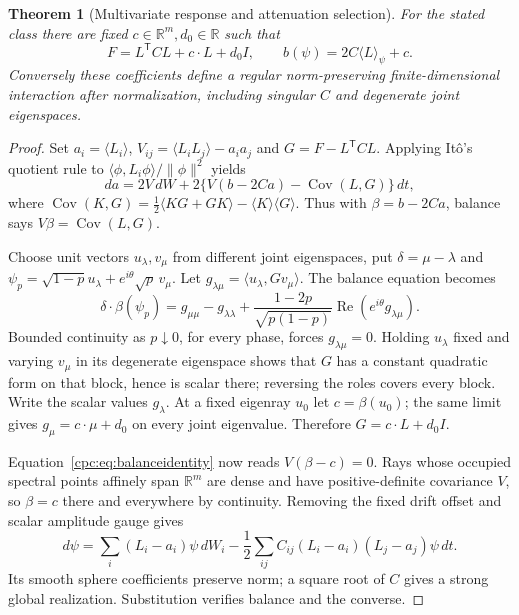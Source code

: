 \documentclass[11pt,oneside,openany]{book}
\newtheorem{theorem}{Theorem}[chapter]
\theoremstyle{definition}
\theoremstyle{remark}\newtheorem{remark}[theorem]{Remark}
\begin{document}
\begin{theorem}[Multivariate response and attenuation selection]
\label{cpc:thm:multivariate}
For the stated class there are fixed $c\in\mathbb R^m,d_0\in\mathbb R$ such that
\begin{equation}
 F=L^{\mathsf T}CL+c\cdot L+d_0I,\qquad
 b(\psi)=2C\langle L\rangle_\psi+c.
 \label{cpc:eq:multiselected}
\end{equation}
Conversely these coefficients define a regular norm-preserving finite-dimensional interaction after normalization, including singular $C$ and degenerate joint eigenspaces.
\end{theorem}
\begin{proof}
Set $a_i=\langle L_i\rangle$, $V_{ij}=\langle L_iL_j\rangle-a_ia_j$ and $G=F-L^{\mathsf T}CL$. Applying It\^o's quotient rule to $\langle\phi,L_i\phi\rangle/\|\phi\|^2$ yields
\begin{equation}
 da=2V\,dW+2\{V(b-2Ca)-\operatorname{Cov}(L,G)\}\,dt,
 \label{cpc:eq:balanceidentity}
\end{equation}
where $\operatorname{Cov}(K,G)=\tfrac12\langle KG+GK\rangle-\langle K\rangle\langle G\rangle$. Thus with $\beta=b-2Ca$, balance says $V\beta=\operatorname{Cov}(L,G)$.

Choose unit vectors $u_\lambda,v_\mu$ from different joint eigenspaces, put $\delta=\mu-\lambda$ and $\psi_p=\sqrt{1-p}u_\lambda+e^{i\theta}\sqrt p\,v_\mu$. Let $g_{\lambda\mu}=\langle u_\lambda,Gv_\mu\rangle$. The balance equation becomes
\[
 \delta\cdot\beta(\psi_p)=g_{\mu\mu}-g_{\lambda\lambda}
 +\frac{1-2p}{\sqrt{p(1-p)}}\operatorname{Re}(e^{i\theta}g_{\lambda\mu}).
\]
Bounded continuity as $p\downarrow0$, for every phase, forces $g_{\lambda\mu}=0$. Holding $u_\lambda$ fixed and varying $v_\mu$ in its degenerate eigenspace shows that $G$ has a constant quadratic form on that block, hence is scalar there; reversing the roles covers every block. Write the scalar values $g_\lambda$. At a fixed eigenray $u_0$ let $c=\beta(u_0)$; the same limit gives $g_\mu=c\cdot\mu+d_0$ on every joint eigenvalue. Therefore $G=c\cdot L+d_0I$.

Equation~\eqref{cpc:eq:balanceidentity} now reads $V(\beta-c)=0$. Rays whose occupied spectral points affinely span $\mathbb R^m$ are dense and have positive-definite covariance $V$, so $\beta=c$ there and everywhere by continuity. Removing the fixed drift offset and scalar amplitude gauge gives
\[
 d\psi=\sum_i(L_i-a_i)\psi\,dW_i
 -\frac12\sum_{ij}C_{ij}(L_i-a_i)(L_j-a_j)\psi\,dt.
\]
Its smooth sphere coefficients preserve norm; a square root of $C$ gives a strong global realization. Substitution verifies balance and the converse.
\end{proof}
\end{document}
